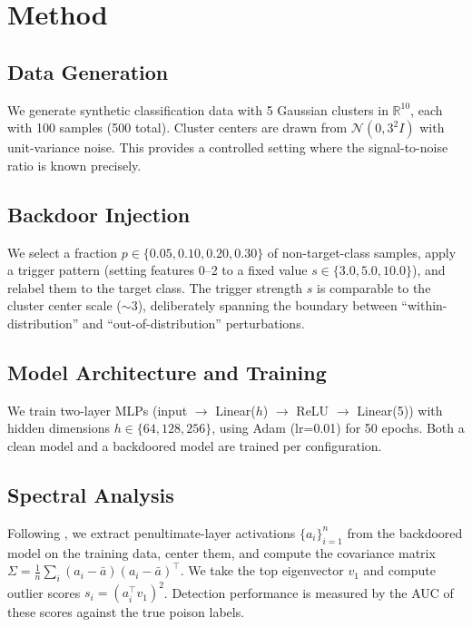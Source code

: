 \documentclass[11pt,a4paper]{article}
\begin{document}
\section{Method}

\subsection{Data Generation}

We generate synthetic classification data with 5 Gaussian clusters in $\mathbb{R}^{10}$, each with 100 samples (500 total). Cluster centers are drawn from $\mathcal{N}(0, 3^2 I)$ with unit-variance noise. This provides a controlled setting where the signal-to-noise ratio is known precisely.

\subsection{Backdoor Injection}

We select a fraction $p \in \{0.05, 0.10, 0.20, 0.30\}$ of non-target-class samples, apply a trigger pattern (setting features 0--2 to a fixed value $s \in \{3.0, 5.0, 10.0\}$), and relabel them to the target class. The trigger strength $s$ is comparable to the cluster center scale ($\sim$3), deliberately spanning the boundary between ``within-distribution'' and ``out-of-distribution'' perturbations.

\subsection{Model Architecture and Training}

We train two-layer MLPs (input $\to$ Linear($h$) $\to$ ReLU $\to$ Linear(5)) with hidden dimensions $h \in \{64, 128, 256\}$, using Adam (lr=0.01) for 50 epochs. Both a clean model and a backdoored model are trained per configuration.

\subsection{Spectral Analysis}

Following \citet{tran2018spectral}, we extract penultimate-layer activations $\{a_i\}_{i=1}^n$ from the backdoored model on the training data, center them, and compute the covariance matrix $\Sigma = \frac{1}{n}\sum_i (a_i - \bar{a})(a_i - \bar{a})^\top$. We take the top eigenvector $v_1$ and compute outlier scores $s_i = (a_i^\top v_1)^2$. Detection performance is measured by the AUC of these scores against the true poison labels.
\end{document}
